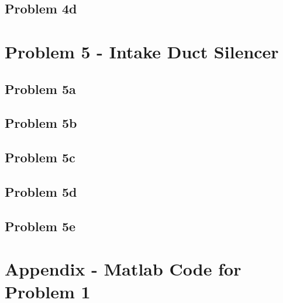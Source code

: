 \subsection*{Problem 4d}










\newpage
\section*{Problem 5 - Intake Duct Silencer}

\subsection*{Problem 5a}

\subsection*{Problem 5b}

\subsection*{Problem 5c}

\subsection*{Problem 5d}

\subsection*{Problem 5e}






\newpage
\section{Appendix - Matlab Code for Problem 1}
\label{appendix:problem1}

